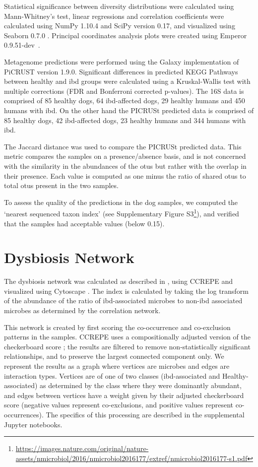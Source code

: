 Statistical significance between diversity distributions were calculated using Mann-Whitney’s test, linear regressions and correlation coefficients were calculated using NumPy 1.10.4 \cite{RN3823} and SciPy version 0.17, and visualized using Seaborn 0.7.0 \cite{RN170}. Principal coordinates analysis plots were created using Emperor 0.9.51-dev~\cite{RN3730}.

Metagenome predictions were performed using the Galaxy implementation of PiCRUST version 1.9.0. Significant differences in predicted KEGG Pathways between healthy and \gls{ibd} groups were calculated using a Kruskal-Wallis test with multiple corrections (FDR and Bonferroni corrected p-values). The 16S data is comprised of 85 healthy dogs, 64 \gls{ibd}-affected dogs, 29 healthy humans and 450 humans with \gls{ibd}. On the other hand the PICRUSt predicted data is comprised of 85 healthy dogs, 42 \gls{ibd}-affected dogs, 23 healthy humans and 344 humans with \gls{ibd}.

The Jaccard distance was used to compare the PICRUSt predicted data. This metric compares the samples on a presence/absence basis, and is not concerned with the similarity in the abundances of the \glspl{otu} but rather with the overlap in their presence. Each value is computed as one minus the ratio of shared \glspl{otu} to total \glspl{otu} present in the two samples.

To assess the quality of the predictions in the dog samples, we computed the `nearest sequenced taxon index' (see Supplementary Figure S3\footnote{\url{https://images.nature.com/original/nature-assets/nmicrobiol/2016/nmicrobiol2016177/extref/nmicrobiol2016177-s1.pdf}}), and verified that the samples had acceptable values (below 0.15).

\section{Dysbiosis Network}

The dysbiosis network was calculated as described in \cite{RN154}, using CCREPE \cite{RN168} and visualized using Cytoscape \cite{RN169}. The index is calculated by taking the log transform of the abundance of the ratio of \gls{ibd}-associated microbes to non-\gls{ibd} associated microbes as determined by the correlation network.

This network is created by first scoring the co-occurrence and co-exclusion patterns in the samples. CCREPE uses a compositionally adjusted version of the checkerboard score \cite{RN3985}; the results are filtered to remove non-statistically significant relationships, and to preserve the largest connected component only. We represent the results as a graph where vertices are microbes and edges are interaction types. Vertices are of one of two classes (\gls{ibd}-associated and Healthy-associated) as determined by the class where they were dominantly abundant, and edges between vertices have a weight given by their adjusted checkerboard score (negative values represent co-exclusions, and positive values represent co-occurrences). The specifics of this processing are described in the supplemental Jupyter notebooks.

